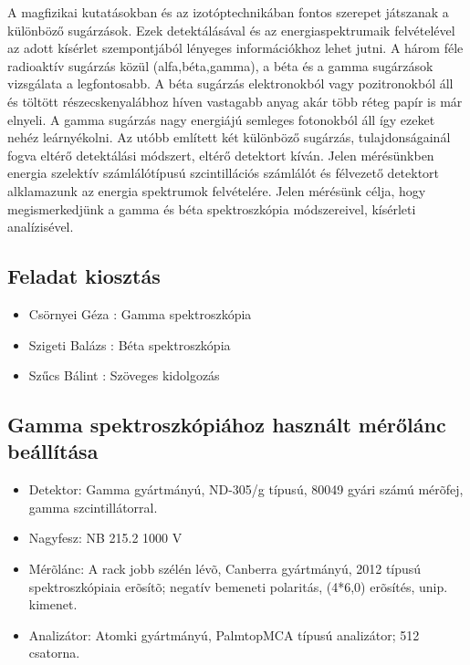 \documentclass[12pt,a4paper]{article}
\begin{document}
A magfizikai kutatásokban és az izotóptechnikában fontos szerepet játszanak a különböző sugárzások. Ezek detektálásával és az energiaspektrumaik felvételével az adott kísérlet szempontjából lényeges információkhoz lehet jutni. A három féle radioaktív sugárzás közül (alfa,béta,gamma), a béta és a gamma sugárzások vizsgálata a legfontosabb. A béta sugárzás elektronokból vagy pozitronokból áll és töltött részecskenyalábhoz híven vastagabb anyag akár több réteg papír is már elnyeli. A gamma sugárzás nagy energiájú semleges fotonokból áll így ezeket nehéz leárnyékolni. Az utóbb említett két különböző sugárzás, tulajdonságainál fogva eltérő detektálási módszert, eltérő detektort kíván. Jelen mérésünkben energia szelektív számlálótípusú szcintillációs számlálót és félvezető detektort alklamazunk az energia spektrumok felvételére.\newline
Jelen mérésünk célja, hogy megismerkedjünk a gamma és béta spektroszkópia módszereivel, kísérleti analízisével.
\newpage
\subsection{Feladat kiosztás}
\begin{itemize}
\item Csörnyei Géza : Gamma spektroszkópia
\item Szigeti Balázs : Béta spektroszkópia
\item Szűcs Bálint : Szöveges kidolgozás
\end{itemize}
\subsection{Gamma spektroszkópiához használt mérőlánc beállítása}
\begin{itemize}
\item Detektor: 
Gamma gyártmányú, ND-305/g típusú, 80049 gyári számú mérõfej, gamma szcintillátorral.
\item Nagyfesz: NB 215.2 1000 V
\item Mérõlánc:
A rack jobb szélén lévõ, Canberra gyártmányú, 2012 típusú spektroszkópiaia erõsítõ; 
negatív bemeneti polaritás, (4*6,0) erõsítés, unip. kimenet.
\item Analizátor:
Atomki gyártmányú, PalmtopMCA típusú analizátor; 
512 csatorna.
\end{itemize}
\end{document}
